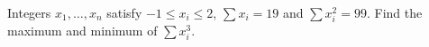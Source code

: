Integers $x_1,\dots,x_n$ satisfy $-1\le x_i\le2$, $\sum x_i=19$ and $\sum x_i^2=99$. Find the maximum and minimum of $\sum x_i^3$.
